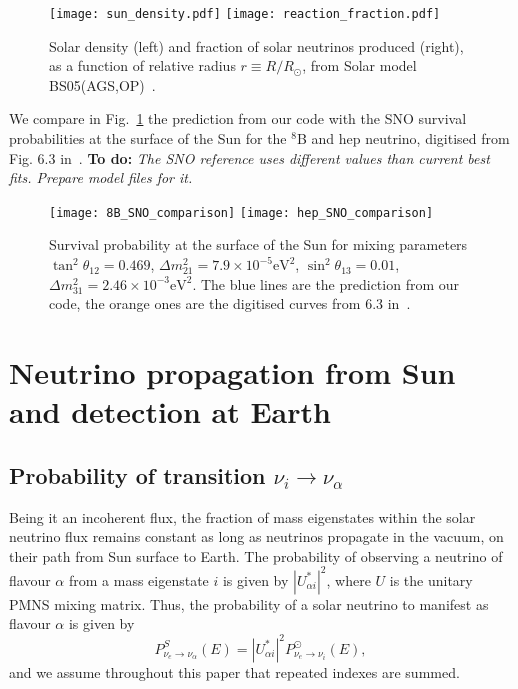 \documentclass{article}
\newcommand{\todo}[1]{\textbf{To do:} \emph{\color{blue} #1}}
\begin{document}
\begin{figure}[ht]
\texttt{[image: sun\_density.pdf]}
\texttt{[image: reaction\_fraction.pdf]}
\caption{Solar density (left) and fraction of solar neutrinos produced (right), as a function of relative radius $r \equiv R/R_\odot$, from Solar model BS05(AGS,OP)~\cite{Bahcall:2004pz}.}
\end{figure}

We compare in Fig.~\ref{fig:SNO_8B_hep_comparison} the prediction from our code with the SNO survival probabilities at the surface of the Sun for the ${}^8$B and hep neutrino, digitised from Fig. 6.3 in~\cite{FiuzadeBarros:2011qna}. \todo{The SNO reference uses different values than current best fits. Prepare model files for it.}

\begin{figure}[ht]
	\texttt{[image: 8B\_SNO\_comparison]}
	\texttt{[image: hep\_SNO\_comparison]}
	\caption{Survival probability at the surface of the Sun for mixing parameters $\tan^2\theta_{12} = 0.469$, $\Delta m_{21}^2 = 7.9 \times 10^{-5} \text{eV}^2$, $\sin^2 \theta_{13} = 0.01$, $\Delta m_{31}^2 = 2.46 \times 10^{-3} \text{eV}^2$. The blue lines are the prediction from our code, the orange ones are the digitised curves from 6.3 in~\cite{FiuzadeBarros:2011qna}.}
	\label{fig:SNO_8B_hep_comparison}
\end{figure}

\section{Neutrino propagation from Sun and detection at Earth}

\subsection{Probability of transition $\nu_i \rightarrow \nu_\alpha$}
Being it an incoherent flux, the fraction of mass eigenstates within the solar neutrino flux remains constant as long as neutrinos propagate in the vacuum, on their path from Sun surface to Earth. The probability of observing a neutrino of flavour $\alpha$ from a mass eigenstate $i$ is given by $|U_{\alpha i}^*|^2$, where $U$ is the unitary PMNS mixing matrix. Thus, the probability of a solar neutrino to manifest as flavour $\alpha$ is given by
\begin{equation}
	P^S_{\nu_e \rightarrow \nu_\alpha}(E) = |U_{\alpha i}^*|^2 P^\odot_{\nu_e \rightarrow \nu_i}(E),
\end{equation}
and we assume throughout this paper that repeated indexes are summed.
\end{document}
